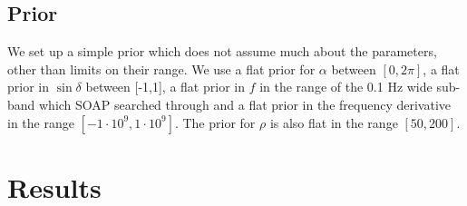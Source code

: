 %
\subsection{Prior}
%
We set up a simple prior which does not assume much about the parameters, other than limits on their range. 
We use a flat prior for $\alpha$ between $[0,2\pi]$, a flat prior in $\sin{\delta}$ between [-1,1], a flat prior in $f$ in the range of the 0.1 Hz wide sub-band which SOAP searched through and a flat prior in the frequency derivative in the range $[-1\cdot 10^{9},1\cdot 10^{9}]$.
The prior for $\rho$ is also flat in the range $[50,200]$.

\section{\label{par_est:results}Results}

